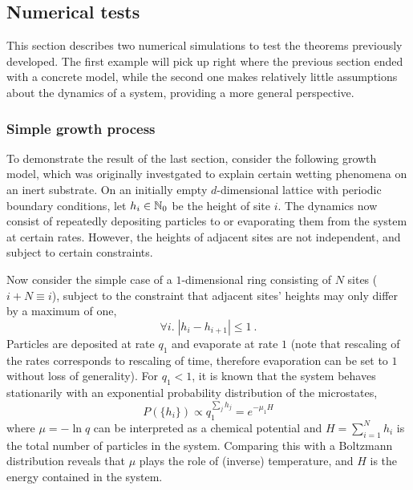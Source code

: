 \subsection{Numerical tests}

This section describes two numerical simulations to test the theorems previously developed. The first example will pick up right where the previous section ended with a concrete model, while the second one makes relatively little assumptions about the dynamics of a system, providing a more general perspective.


\subsubsection{Simple growth process}


To demonstrate the result of the last section, consider the following growth model, which was originally investgated to explain certain wetting phenomena on an inert substrate. On an initially empty \(d\)-dimensional lattice with periodic boundary conditions, let \(h_i \in\mathbb{N}_0\) be the height of site \(i\). The dynamics now consist of repeatedly depositing particles to or evaporating them from the system at certain rates. However, the heights of adjacent sites are not independent, and subject to certain constraints.

Now consider the simple case of a \(1\)-dimensional ring consisting of \(N\) sites (\(i+N \equiv i\)), subject to the constraint that adjacent sites' heights may only differ by a maximum of one,
%
\begin{equation}
	\forall i.\; |h_i - h_{i+1}| \leq 1 ~.
\end{equation}
%
Particles are deposited at rate \(q_1\) and evaporate at rate \(1\) (note that rescaling of the rates corresponds to rescaling of time, therefore evaporation can be set to \(1\) without loss of generality). For \(q_1 < 1\), it is known that the system behaves stationarily with an exponential probability distribution of the microstates,
%
\begin{equation}
	P(\{h_i\}) \propto q_1^{\sum_jh_j} = e^{-\mu_1 H}
\end{equation}
%
where \(\mu = -\ln q\) can be interpreted as a chemical potential and \(H = \sum_{i=1}^Nh_i\) is the total number of particles in the system. Comparing this with a Boltzmann distribution reveals that \(\mu\) plays the role of (inverse) temperature, and \(H\) is the energy contained in the system.

